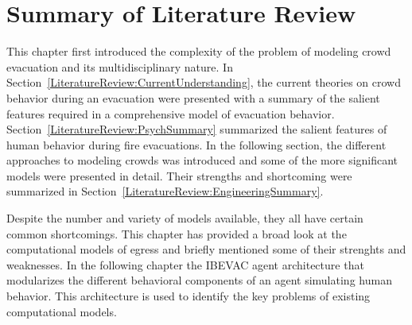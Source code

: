 \section{Summary of Literature Review}
\label{LiteratureReview:Summary}
This chapter first introduced the complexity of the problem of modeling crowd evacuation and its multidisciplinary nature. In Section~\ref{LiteratureReview:CurrentUnderstanding}, the current theories on crowd behavior during an evacuation were presented with a summary of the salient features required in a comprehensive model of evacuation behavior. Section~\ref{LiteratureReview:PsychSummary} summarized the salient features of human behavior during fire evacuations. In the following section, the different approaches to modeling crowds was introduced and some of the more significant models were presented in detail. Their strengths and shortcoming were summarized in Section~\ref{LiteratureReview:EngineeringSummary}.

Despite the number and variety of models available, they all have certain common shortcomings. This chapter has provided a broad look at the computational models of egress and briefly mentioned some of their strenghts and weaknesses. In the following chapter the IBEVAC agent architecture that modularizes the different behavioral components of an agent simulating human behavior. This architecture is used to identify the key problems of existing computational models.


